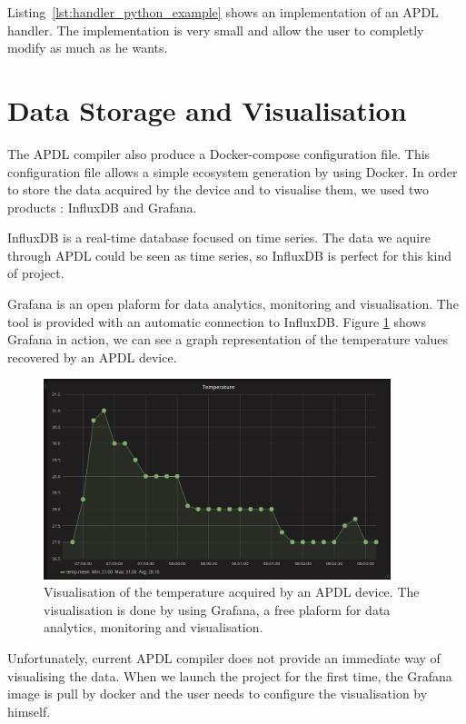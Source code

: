 Listing~\ref{lst:handler_python_example} shows an implementation of an
\gls{APDL} handler. The implementation is very small and allow the user to
completly modify as much as he wants.

\section{Data Storage and Visualisation}
\label{sec:data_storage}

The \gls{APDL} compiler also produce a Docker-compose configuration file. This
configuration file allows a simple ecosystem generation by using Docker. In order
to store the data acquired by the device and to visualise them, we used two
products : InfluxDB and Grafana.

InfluxDB\cite{InfluxData} is a real-time database focused on time series. The
data we aquire through \gls{APDL} could be seen as time series, so InfluxDB is
perfect for this kind of project.

Grafana\cite{GrafanaLabs} is an open plaform for data analytics, monitoring and
visualisation. The tool is provided with an automatic connection to InfluxDB.
Figure \ref{fig:grafana_example} shows Grafana in action, we can see a graph
representation of the temperature values recovered by an \gls{APDL} device.

\begin{figure}[ht]
  \centering
  \includegraphics[width=0.9\textwidth]{img/grafana_example}
  \caption[Visualisation of the temperature using Grafana]{Visualisation of the
    temperature acquired by an \gls{APDL} device. The visualisation is done by
    using Grafana, a free plaform for data analytics, monitoring and visualisation.}
  \label{fig:grafana_example} 
\end{figure}

Unfortunately, current \gls{APDL} compiler does not provide an immediate way of
visualising the data. When we launch the project for the first time, the Grafana
image is pull by docker and the user needs to configure the visualisation by
himself.

